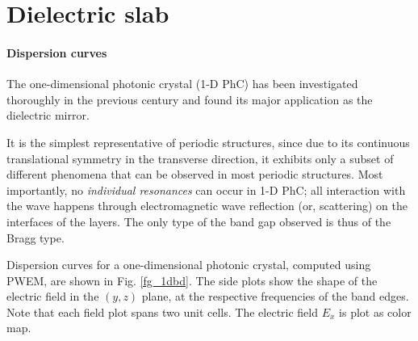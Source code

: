 


\label{section_result}
\section{Dielectric slab} \label{section_Dielectric slab}
\paragraph{Dispersion curves}
The one-dimensional photonic crystal (1-D PhC) has been investigated thoroughly in the previous century and found its major application as the dielectric mirror. 

It is the simplest representative of periodic structures, since due to its continuous translational symmetry in the transverse direction, it exhibits only a subset of different phenomena that can be observed in most periodic structures. Most importantly, no \textit{individual resonances} can occur in 1-D PhC; all interaction with the wave happens through electromagnetic wave reflection (or, scattering) on the interfaces of the layers. The only type of the band gap observed is thus of the Bragg type.

Dispersion curves for a one-dimensional photonic crystal, computed using PWEM, are shown in Fig. \ref{fg_1dbd}. The side plots show the shape of the electric field  in the $(y,z)$ plane, at the respective frequencies of the band edges. Note that each field plot spans two unit cells. The electric field $E_x$ is plot as color map.

